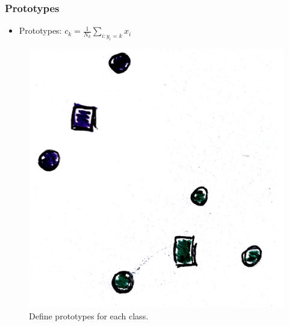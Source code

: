 \documentclass[10pt,mathserif]{beamer}
\begin{document}
\begin{frame}
  \frametitle{Prototypes}
 \begin{itemize}
 \item Prototypes: $c_k = \frac{1}{N_k} \sum_{i : y_i = k} x_i$
 \end{itemize} 
\begin{figure}[ht]
  \centering
  \includegraphics[width=0.7\paperwidth]{figure/prototypes_2}
  \caption{Define prototypes for each class.\label{fig:prototypes_2} }
\end{figure}
\end{frame}
\end{document}
